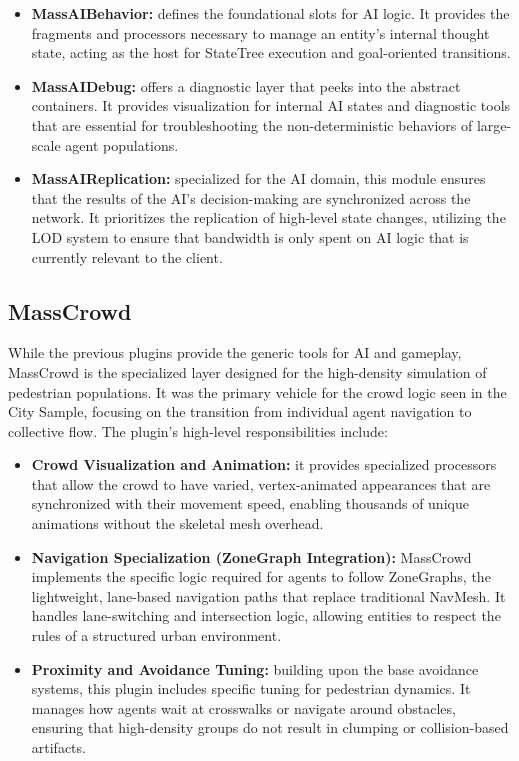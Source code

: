 \begin{itemize}
    \item \textbf{MassAIBehavior:} defines the foundational slots for AI logic. It provides the fragments and processors necessary to manage an entity's internal thought state, acting as the host for StateTree execution and goal-oriented transitions.
    \item \textbf{MassAIDebug:} offers a diagnostic layer that peeks into the abstract containers. It provides visualization for internal AI states and diagnostic tools that are essential for troubleshooting the non-deterministic behaviors of large-scale agent populations.
    \item \textbf{MassAIReplication:} specialized for the AI domain, this module ensures that the results of the AI’s decision-making are synchronized across the network. It prioritizes the replication of high-level state changes, utilizing the LOD system to ensure that bandwidth is only spent on AI logic that is currently relevant to the client.
\end{itemize}

\subsection{MassCrowd}

While the previous plugins provide the generic tools for AI and gameplay, MassCrowd is the specialized layer designed for the high-density simulation of pedestrian populations. It was the primary vehicle for the crowd logic seen in the City Sample, focusing on the transition from individual agent navigation to collective flow.
The plugin's high-level responsibilities include:

\begin{itemize}
    \item \textbf{Crowd Visualization and Animation:} it provides specialized processors that allow the crowd to have varied, vertex-animated appearances that are synchronized with their movement speed, enabling thousands of unique animations without the skeletal mesh overhead.
    \item \textbf{Navigation Specialization (ZoneGraph Integration):} MassCrowd implements the specific logic required for agents to follow ZoneGraphs, the lightweight, lane-based navigation paths that replace traditional NavMesh. It handles lane-switching and intersection logic, allowing entities to respect the rules of a structured urban environment.
    \item \textbf{Proximity and Avoidance Tuning:} building upon the base avoidance systems, this plugin includes specific tuning for pedestrian dynamics. It manages how agents wait at crosswalks or navigate around obstacles, ensuring that high-density groups do not result in clumping or collision-based artifacts.
\end{itemize}